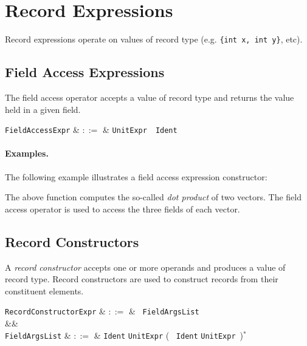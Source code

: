 \section{Record Expressions}
\label{c_expr_record}

Record expressions operate on values of record type (e.g. \lstinline|{int x, int y}|, etc).


\subsection{Field Access Expressions}
\label{c_expr_field_access}

The field access operator accepts a value of record type and returns the value held in a given field.

\begin{syntax}
  \verb+FieldAccessExpr+ & $::=$ & \verb+UnitExpr+\ \ \verb+Ident+\\
\end{syntax}

\paragraph{Examples.}  The following example illustrates a field access expression constructor:



The above function computes the so-called {\em dot product} of two vectors.  The field access operator is used to access the three fields of each vector. 


\subsection{Record Constructors}
\label{c_expr_record_constructor}
A {\em record constructor} accepts one or more operands and produces a value of record type.  Record constructors are used to construct records from their constituent elements.  

\begin{syntax}
  \verb+RecordConstructorExpr+ & $::=$ & \token{\{}\ \verb+FieldArgsList+\ \token{\}}\\
&&\\
  \verb+FieldArgsList+ & $::=$ & \verb+Ident+ \token{:} \verb+UnitExpr+ \big(\ \token{,} \verb+Ident+ \token{:} \verb+UnitExpr+\ \big)$^*$\\
\end{syntax}

